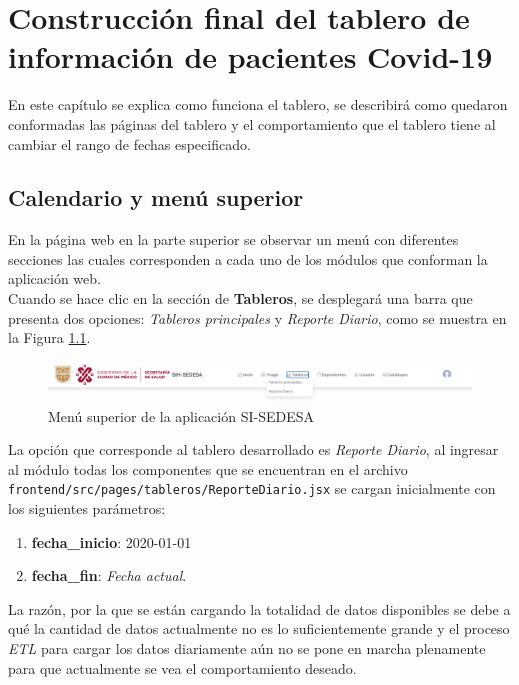 \chapter{Construcción final del tablero de información de pacientes Covid-19}\label{cap:resultados}

En este capítulo se explica como funciona el tablero, se describirá como quedaron conformadas las páginas del tablero y el comportamiento que el tablero tiene al cambiar el rango de fechas especificado.

\section{Calendario y menú superior}

En la página web en la parte superior se observar un menú con diferentes secciones las cuales corresponden a cada uno de los módulos que conforman la aplicación web.\\

Cuando se hace clic en la sección de \textbf{Tableros}, se desplegará una barra que presenta dos opciones: \textit{Tableros principales} y \textit{Reporte Diario}, como se muestra en la Figura \ref{fig:menu_superior}.

\begin{figure}[ht!]
    \centering
    \includegraphics[width=\textwidth]{images/uso2.png}
    \caption{Menú superior de la aplicación SI-SEDESA}
    \label{fig:menu_superior}
\end{figure}

La opción que corresponde al tablero desarrollado es \textit{Reporte Diario}, al ingresar al módulo todas los componentes que se encuentran en el archivo \texttt{frontend/src/pages/tableros/ReporteDiario.jsx} se cargan inicialmente con los siguientes parámetros:

\begin{enumerate}
    \item \textbf{fecha\_inicio}: 2020-01-01
    \item \textbf{fecha\_fin}: \textit{Fecha actual}.
\end{enumerate}

La razón, por la que se están cargando la totalidad de datos disponibles se debe a qué la cantidad de datos actualmente no es lo suficientemente grande y el proceso \textit{ETL} para cargar los datos diariamente aún no se pone en marcha plenamente para que actualmente se vea el comportamiento deseado.\\

